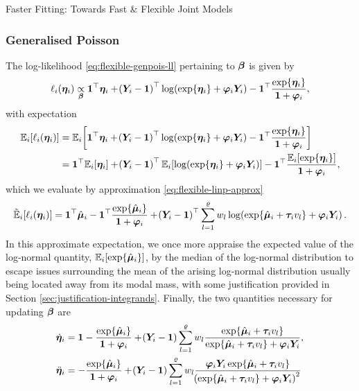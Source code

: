 \begin{chapter}{\label{cha:flexible}Faster Fitting: Towards Fast \& Flexible Joint Models}
\subsubsection{Generalised Poisson}
The log-likelihood \eqref{eq:flexible-genpois-ll} pertaining to $\bm{\beta}$ is given by
\begin{equation*}
    \ell_i\!\left(\bm{\eta}_i\right)\underset{\bm{\beta}}{\propto}\bm{1}^\top\bm{\eta}_i+\!\left(\bm{Y}_i-\bm{1}\right)^\top\log\!\left(\exp\!\left\{\bm{\eta}_i\right\}+\bm{\varphi}_i\bm{Y}_i\right)-\bm{1}^\top\frac{\exp\!\left\{\bm{\eta}_i\right\}}{\bm{1}+\bm{\varphi}_i},
\end{equation*}
with expectation
\begin{align*}
    \Expi{\elli{\linp}}&=\Expi{\boneT\linp+\lb\Y-\bm{1}\rb^\top\log\lb\exp\lbr\linp\rbr+\bphi\Y\rb-\boneT\frac{\exp\lbr\linp\rbr}{\bm{1}+\bphi}}\\
    &=\boneT\Expi{\linp}+\lb\Y-\bm{1}\rb^\top\Expi{\log\lb\exp\lbr\linp\rbr+\bphi\Y\rb}-\boneT\frac{\Expi{\exp\lbr\linp\rbr}}{\bm{1}+\bphi},
\end{align*}
which we evaluate by approximation \eqref{eq:flexible-linp-approx}
\begin{align*}
    \tilde{\mathbb{E}}_i\!\left[\ell_i\!\left(\bm{\eta}_i\right)\right]=\bm{1}^\top\hat{\bm{\mu}}_i-\bm{1}^\top\frac{\exp\!\left\{\hat{\bm{\mu}}_i\right\}}{\bm{1}+\bm{\varphi}_i}+\!\left(\bm{Y}_i-\bm{1}\right)^\top\sum_{l=1}^\varrho w_l\log\!\left(\exp\!\left\{\hat{\bm{\mu}}_i+\bm{\tau}_i v_l\right\}+\bm{\varphi}_i\bm{Y}_i\right).
\end{align*}
In this approximate expectation, we once more appraise the expected value of the log-normal quantity, $\mathbb{E}_i\!\left[\exp\!\left\{\hat{\bm{\mu}}_i\right\}\right]$, by the median of the log-normal distribution to escape issues surrounding the mean of the arising log-normal distribution usually being located away from its modal mass, with some justification provided in Section \ref{sec:justification-integrands}. Finally, the two quantities necessary for updating $\bm{\beta}$ are
\begin{equation}
    \begin{aligned}
        \dotlinp &= \bm{1} - \frac{\exp\lbr\hbmu\rbr}{\bm{1}+\bphi} + \lb\Y-\bm{1}\rb\Sl w_l\frac{\exp\lbr\hbmu+\btau v_l\rbr}{\exp\lbr\hbmu+\btau v_l\rbr + \bphi \Y},\\
        \ddotlinp &=  - \frac{\exp\lbr\hbmu\rbr}{\bm{1}+\bphi} + \lb\Y-\bm{1}\rb\Sl w_l\frac{\bphi\Y\exp\lbr\hbmu+\btau v_l\rbr}{\lb\exp\lbr\hbmu+\btau v_l\rbr + \bphi \Y\rb^2}
    \end{aligned}
\label{eq:flexible-Mstep-genpois}
\end{equation}

\end{chapter}
